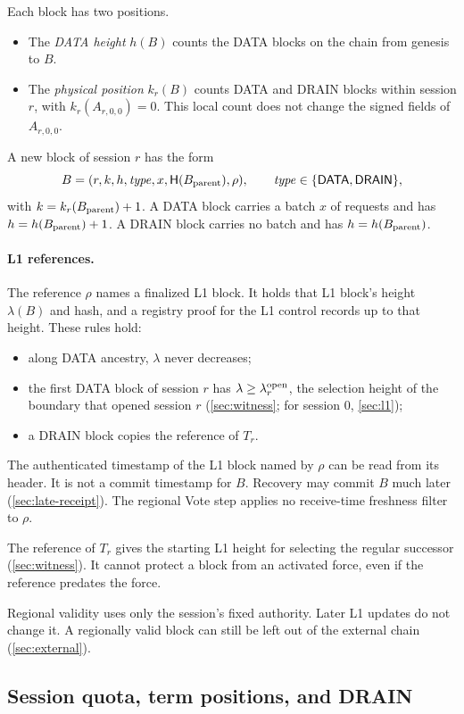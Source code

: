 \documentclass[11pt,a4paper]{article}
\newif\ifrevmarks
\newcommand{\Rv}[1]{\ifrevmarks\leavevmode{\color{rvBlue}#1}\else#1\fi}
\newcommand{\Cid}[1]{\ifrevmarks\textsuperscript{\hyperlink{chg:#1}{\color{rvBlue}\sffamily\scriptsize#1}}\fi}
\newcommand{\Hash}{\mathsf H}
\newcommand{\tagg}[1]{\ensuremath{\mathsf{#1}}}
\begin{document}
Each block has two positions.
\begin{itemize}
\item The \emph{DATA height} $h(B)$ counts the DATA blocks on the chain
from genesis to $B$.
\item The \emph{physical position} $k_r(B)$ counts DATA and DRAIN blocks
within session $r$, with $k_r(A_{r,0,0})=0$. This local count does not change
the signed fields of $A_{r,0,0}$.
\end{itemize}
A new block of session $r$ has the form
\[
 B=(r,k,h,\mathit{type},x,\Hash(B_{\rm parent}),\rho),
 \qquad \mathit{type}\in\{\tagg{DATA},\tagg{DRAIN}\},
\]
with $k=k_r(B_{\rm parent})+1$. A DATA block carries a batch $x$ of
requests and has $h=h(B_{\rm parent})+1$. A DRAIN block carries no batch
and has $h=h(B_{\rm parent})$.

\paragraph{L1 references.}
The reference $\rho$ names a finalized L1 block. It holds that L1
block's height $\lambda(B)$ and hash, and a registry proof for the L1
control records up to that height. These rules hold:
\begin{itemize}
\item along DATA ancestry, $\lambda$ never decreases;
\item the first DATA block of session $r$ has $\lambda\ge
\lambda^{\rm open}_r$, the selection height of the boundary that opened
session $r$ (\cref{sec:witness}\Rv{; for session $0$, \cref{sec:l1}});
\item a DRAIN block copies the reference of $T_r$.
\end{itemize}
The authenticated timestamp of the L1 block named by $\rho$ can be
read from its header. It is not a commit timestamp for $B$. Recovery
may commit $B$ much later \Rv{(\cref{sec:late-receipt}). The
regional Vote step applies no receive-time freshness filter to $\rho$.}

The reference of $T_r$ gives the starting L1 height for selecting the
regular successor (\cref{sec:witness}). It cannot protect a block from
an activated force, even if the reference predates the force.

Regional validity uses only the session's fixed authority. Later L1
updates do not change it. A regionally valid block can still be left out
of the external chain (\cref{sec:external}).

\subsection{Session quota, term positions, and DRAIN}
\label{sec:quota}
\end{document}
